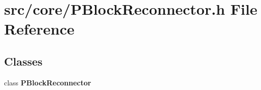 \section{src/core/PBlock\-Reconnector.h File Reference}
\label{PBlockReconnector_8h}


\subsection*{Classes}
\begin{CompactItemize}
\item 
class {\bf PBlock\-Reconnector}
\end{CompactItemize}
